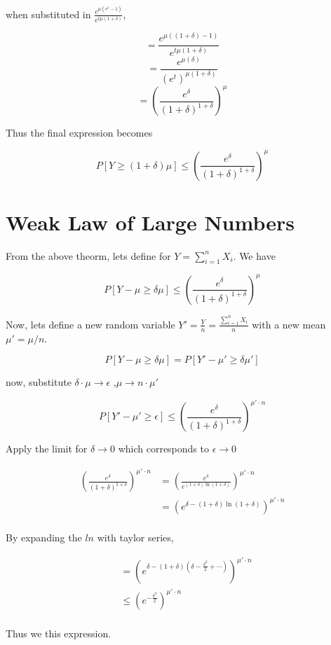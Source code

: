 \documentclass[openany]{book}
\begin{document}
	when substituted in $\frac{e ^ {\mu (e^t-1)}}{e^{t \mu (1 + \delta)}}$,
	
	\[ = \frac{e^{\mu ((1+\delta) - 1)}}{e^{t \mu (1 + \delta)}} \]
	\[ = \frac{e^{\mu (\delta)}}{(e^t)^{\mu (1 + \delta)}} \]
	\[ = (\frac{e^\delta}{(1+\delta)^{1+\delta}})^\mu \]
	
	Thus the final expression becomes
	
	\[ \boxed{P[Y \geq (1 + \delta) \mu] \leq (\frac{e^\delta}{(1+\delta)^{1+\delta}})^\mu} \]


\chapter{Weak Law of Large Numbers}
	
	From the above theorm, lets define for $Y = \sum_{i=1}^{n} X_i$. We have
	
	\[ P[Y - \mu \geq \delta \mu] \leq (\frac{e^\delta}{(1+\delta)^{1+\delta}})^\mu \]
	
	Now, lets define a new random variable $Y' = \frac{Y}{n} = \frac{\sum_{i=1}^{n}X_i}{n}$ with a new 
	mean $\mu' = \mu / n$.
	
	\[ P[Y - \mu \geq \delta \mu] = P[Y' - \mu' \geq \delta \mu'] \]
	
	now, substitute $\delta \cdot \mu \rightarrow \epsilon$ ,$\mu \rightarrow n \cdot \mu'$
	
	\[  P[Y' - \mu' \geq \epsilon] \leq (\frac{e^\delta}{(1+\delta)^{1+\delta}})^{\mu' \cdot n}\]
	
	Apply the limit for $\delta \rightarrow 0$ which corresponds to $\epsilon \rightarrow 0$
	
	\begin{align*}
		(\frac{e^\delta}{(1+\delta)^{1+\delta}})^{\mu' \cdot n} &= (\frac{e^\delta}{e^{(1+\delta) \ln (1+\delta)}})^{\mu' \cdot n} \\
		&= (e^{\delta-(1+\delta) \ln (1+\delta)})^{\mu' \cdot n} \\  
	\end{align*}
	
	By expanding the $ln$ with taylor series, 
	
	\begin{align*}
		&= (e^{\delta-(1+\delta)(\delta - \frac{\delta^2}{2} + \cdots)})^{\mu' \cdot n} \\  
		&\leq (e^{-\frac{\delta^2}{2} })^{\mu' \cdot n} \\  
	\end{align*}
	
	Thus we this expression. 
	
\end{document}
